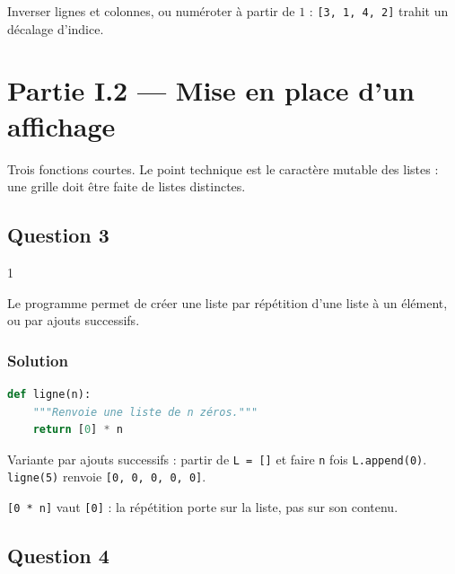 \documentclass[11pt,a4paper]{article}
\begin{document}
\begin{piege}

Inverser lignes et colonnes, ou numéroter à partir de \(1\) : \texttt{{[}3,\ 1,\ 4,\ 2{]}} trahit un décalage d'indice.

\end{piege}

\hypertarget{partie-i.2-mise-en-place-dun-affichage}{%
\section{Partie I.2 --- Mise en place d'un affichage}\label{partie-i.2-mise-en-place-dun-affichage}}

Trois fonctions courtes. Le point technique est le caractère mutable des listes : une grille doit être faite de listes distinctes.

\hypertarget{question-3}{%
\subsection{Question 3}\label{question-3}}

\begin{indication}{1}

Le programme permet de créer une liste par répétition d'une liste à un élément, ou par ajouts successifs.

\end{indication}

\hypertarget{solution-2}{%
\subsubsection{Solution}\label{solution-2}}

\begin{lstlisting}[language=Python]
def ligne(n):
    """Renvoie une liste de n zéros."""
    return [0] * n
\end{lstlisting}

Variante par ajouts successifs : partir de \texttt{L\ =\ {[}{]}} et faire \texttt{n} fois \texttt{L.append(0)}. \texttt{ligne(5)} renvoie \texttt{{[}0,\ 0,\ 0,\ 0,\ 0{]}}.

\begin{piege}

\texttt{{[}0\ *\ n{]}} vaut \texttt{{[}0{]}} : la répétition porte sur la liste, pas sur son contenu.

\end{piege}

\hypertarget{question-4}{%
\subsection{Question 4}\label{question-4}}
\end{document}
